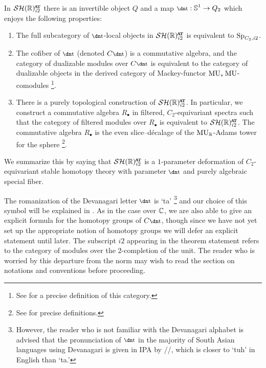 \begin{thm}\label{thm:main}
  In $\SHRat$
  there is an invertible object $Q$ and a map $\ta : \Ss^1 \to Q_2$
  which enjoys the following properties:%
  \begin{enumerate}
  \item[(GT)] The full subcategory of $\ta$-local objects in $\SHR^{\at}_{i2}$ is equivalent to $\operatorname{\mathrm{Sp}}_{C_2,i2}$.
  \item[(AD)] The cofiber of $\ta$ (denoted $C\ta$) is a commutative algebra, and the category of dualizable modules over $C\ta$ is equivalent to the category of dualizable objects in the derived category of Mackey-functor $\operatorname{\mathrm{MU}}_*\operatorname{\mathrm{MU}}$-comodules \footnote{See  for a precise definition of this category.}.
  \item[(GR)] There is a purely topological construction of $\SHRat$.
    In particular, we construct a commutative algebra $R_\bullet$ in filtered, $C_2$-equivariant spectra
    such that the category of filtered modules over $R_\bullet$ is equivalent to $\SHRat$.
    The commutative algebra $R_\bullet$ is the even slice--d\'ecalage of the $\mathrm{MU}_{\mathbb{R}}$-Adams tower for the sphere \footnote{See  for precise definitions.}.    
  \end{enumerate}
  
  We summarize this by saying that $\SHR^{\at}_{i2}$ is a $1$-parameter deformation of $C_2$-equivariant stable homotopy theory with parameter $\ta$ and purely algebraic special fiber.
\end{thm}

The romanization of the Devanagari letter $\ta$ is `ta' \footnote{However, the reader who is not familiar with the Devanagari alphabet is advised that the pronunciation of $\ta$ in the majority of South Asian languages using Devanagari is given in IPA by /\textschwa/, which is closer to `tuh' in English than `ta.'}  and
our choice of this symbol will be explained in . As in the case over $\mathbb{C}$, we are also able to give an explicit formula for the homotopy groups of $C\ta$, though since we have not yet set up the appropriate notion of homotopy groups we will defer an explicit statement until later.
The subscript $i2$ appearing in the theorem statement refers to the category of modules over the $2$-completion of the unit. 
The reader who is worried by this departure from the norm may wish to read the section on notations and conventions before proceeding.

